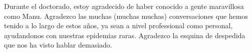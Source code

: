 Durante el doctorado, estoy agradecido de haber conocido a gente maravillosa como Manu. Agradezco las muchas (muchas muchas) conversaciones que hemos tenido a lo largo de estos años, ya sean a nivel professional como personal, ayudandonos con nuestras epidemias raras. Agradezco la esquina de despedida que nos ha visto hablar demasiado. 



\thispagestyle{empty}


\vfill